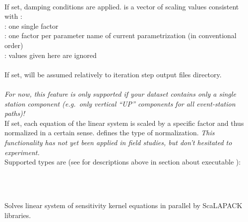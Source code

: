 \paragraph{}
If set, damping conditions are applied.  is a vector of scaling values consistent 
with :\\
: one single factor\\
: one factor per parameter name of current parametrization (in conventional order)\\
 : values given here are ignored
\paragraph{}
If set,  will be assumed relatively to iteration step output files directory.
\paragraph{}
\emph{For now, this feature is only supported if your dataset contains only a single station component 
(e.g.\ only vertical ``UP'' components for all event-station paths)!}\\
If set, each equation of the linear system is scaled by a specific factor and thus normalized in a certain sense.
 defines the type of normalization. \emph{This 
functionality has not yet been applied in field studies, but don't hesitated to experiment.}\\
Supported types are (see for descriptions above in section about executable ):\\
\\
\\
%
%
\subsection{} \label{programs_scripts,sec:bin_prog,sec:solve_par_kernel_sys}
Solves linear system of sensitivity kernel equations in parallel by ScaLAPACK libraries.

